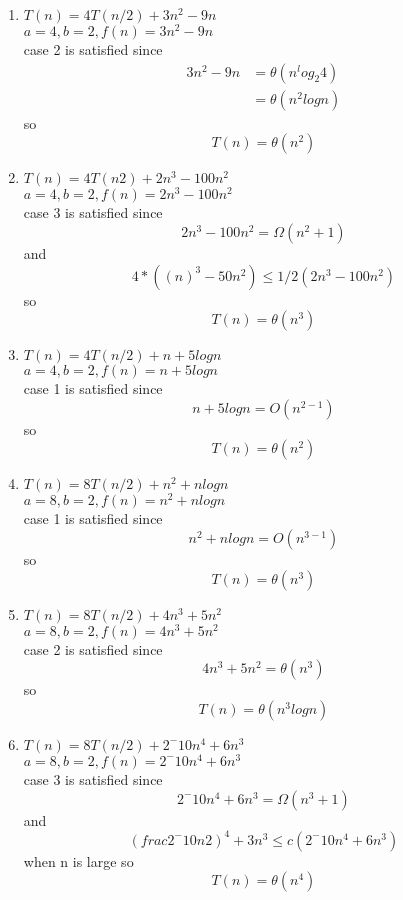 \documentclass[11pt]{article}
\begin{document}
	\begin{enumerate}
	\item $T(n) = 4T(n/2) + 3n^2 - 9n$\\
	$a = 4, b =2, f(n) = 3n^2 -9n$\\
	case 2 is satisfied since
	\begin{align*}
	3n^2 - 9n &= \theta(n^log_{2}4)\\
	&= \theta(n^2 log n)
	\end{align*}
	so
	$$T(n) = \theta(n^2)$$
	\item $T(n) = 4T(n2) + 2n^3 - 100 n^2$\\
	$a = 4, b =2,f(n) = 2n^3 - 100 n^2$\\
	case 3 is satisfied since
	$$2n^3 - 100n^2 = \Omega(n^2+1)$$
	and
	$$4 * ((n) ^ 3 - 50n^2) \leq 1/2 (2n^3 - 100 n^2) $$
	so
	$$T(n) = \theta(n^3)$$
	\item $T(n) = 4T(n/2) + n + 5 log n$\\
	$a = 4 , b= 2, f(n) = n + 5 log n$\\
	case 1 is satisfied since 
	$$n + 5 log n = O(n^{2 -1})$$
	so
	$$T(n) = \theta(n^2)$$
	\item $T(n) = 8T(n/2) + n^2 + n log n$\\
	$a = 8 , b= 2, f(n) = n^2 + n log n$\\
	case 1 is satisfied since
	$$n^2 + n log n = O(n^{3 -1})$$
	so
	$$T(n) = \theta(n^3)$$
	\item $T(n) = 8T(n/2) + 4n^3 + 5n^2$\\
	$a = 8 , b= 2, f(n) = 4n^3 + 5n^2$\\
	case 2 is satisfied since
	$$4n^3 + 5n^2 = \theta(n^{3})$$
	so
	$$T(n) = \theta(n^3log n)$$
	
	\item $T(n) = 8T(n/2) + 2^-10 n^4 + 6n^3$\\
	$a = 8 , b= 2, f(n) = 2^-10 n^4 + 6n^3$\\
	case 3 is satisfied since
	$$ 2^-10 n^4 + 6n^3 = \Omega(n^{3}+1)$$
	and
	$$ (frac{2^-10 n}{2})^4 + 3n^3 \leq c (2^-10 n^4 + 6n^3)$$
	when n is large
	so
	$$T(n) = \theta(n^4)$$	
	\end{enumerate}
	\bigskip
	
	
\end{document}
